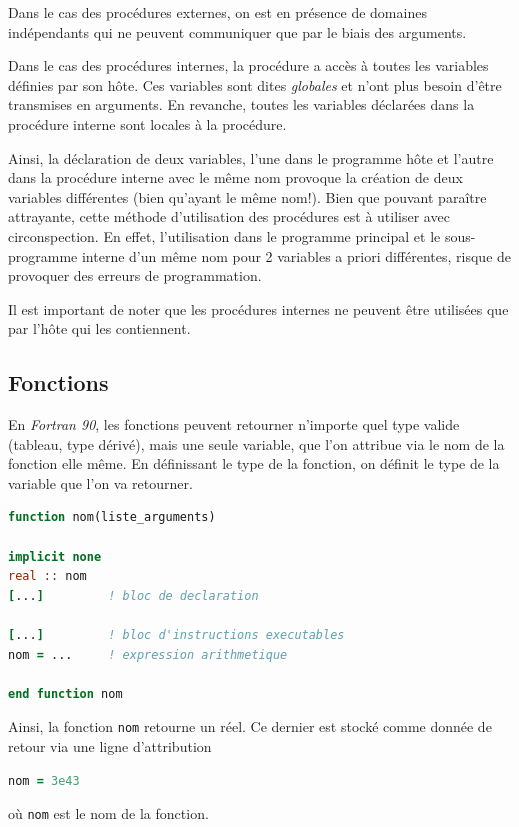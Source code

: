 \documentclass[a4paper,twoside]{article}
\begin{document}
Dans le cas des procédures externes, on est en présence de domaines indépendants qui ne peuvent communiquer que par le biais des arguments. 

Dans le cas des procédures internes, la procédure a accès à toutes les variables définies par son hôte. Ces variables sont dites \emph{globales} et n'ont plus besoin d'être transmises en arguments. En revanche, toutes les variables déclarées dans la procédure interne sont locales à la procédure. 

Ainsi, la déclaration de deux variables, l'une dans le programme hôte et l'autre dans la procédure interne avec le même nom provoque la création de deux variables différentes (bien qu'ayant le même nom!). Bien que pouvant paraître attrayante, cette méthode d'utilisation des procédures est à utiliser avec circonspection. En effet, l'utilisation dans le programme principal et le sous-programme interne d'un même nom pour 2 variables a priori différentes, risque de provoquer des erreurs de programmation. 

\begin{attention}
Il est important de noter que les procédures internes ne peuvent être utilisées que par l'hôte qui les contiennent. 
\end{attention}

\subsection{Fonctions}
En \emph{Fortran 90}, les fonctions peuvent retourner n'importe quel type valide (tableau, type dérivé), mais une seule variable, que l'on attribue via le nom de la fonction elle même. En définissant le type de la fonction, on définit le type de la variable que l'on va retourner.

\begin{lstlisting}[language=Fortran]
function nom(liste_arguments)

implicit none 
real :: nom 
[...]         ! bloc de declaration
 
[...]         ! bloc d'instructions executables
nom = ...     ! expression arithmetique

end function nom 
\end{lstlisting}

Ainsi, la fonction \texttt{nom} retourne un réel. Ce dernier est stocké comme donnée de retour via une ligne d'attribution
\begin{lstlisting}[language=Fortran]
nom = 3e43
\end{lstlisting}
où \texttt{nom} est le nom de la fonction.
\end{document}
